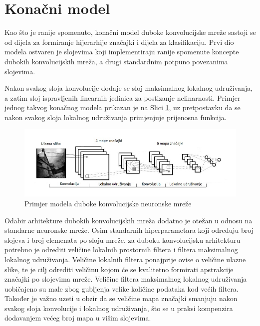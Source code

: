 \documentclass[lmodern, utf8, diplomski, numeric]{fer}
\begin{document}
\newpage

\section{Konačni model}

Kao što je ranije spomenuto, konačni model duboke konvolucijske mreže sastoji se od dijela za formiranje hijerarhije značajki i dijela za klasifikaciju. Prvi dio modela ostvaren je slojevima koji implementiraju ranije spomenute koncepte dubokih konvolucijskih mreža, a drugi standardnim potpuno povezanima slojevima. 

Nakon svakog sloja konvolucije dodaje se sloj maksimalnog lokalnog udruživanja, a zatim sloj ispravljenih linearnih jedinica za postizanje nelinarnosti. Primjer jednog takvog konačnog modela prikazan je na Slici \ref{fig:cnnmodel}, uz pretpostavku da se nakon svakog sloja lokalnog udruživanja primjenjuje prijenosna funkcija.

\begin{figure}[ht!]
\centering
\includegraphics[width=15cm]{slike/convnet.jpg}
\caption{Primjer modela duboke konvolucijske neuronske mreže}
\label{fig:cnnmodel}
\end{figure}

Odabir arhitekture dubokih konvolucijskih mreža dodatno je otežan u odnosu na standarne neuronske mreže. Osim standarnih hiperparametara koji određuju broj slojeva i broj elemenata po sloju mreže, za duboku konvolucijsku arhitekturu potrebno je odrediti veličine lokalnih prostornih filtera i filtera maksimalnog lokalnog udruživanja. Veličine lokalnih filtera ponajprije ovise o veličine ulazne slike, te je cilj odrediti veličinu kojom će se kvalitetno formirati apstrakcije značajki po slojevima mreže. Veličine filtera maksimalnog lokalnog udruživanja uobičajeno su male zbog gubljenja velike količine podataka kod većih filtera. Također je važno uzeti u obzir da se veličine mapa značajki smanjuju nakon svakog sloja konvolucije i lokalnog udruživanja, što se u praksi kompenzira dodavanjem većeg broj mapa u višim slojevima.
\end{document}
